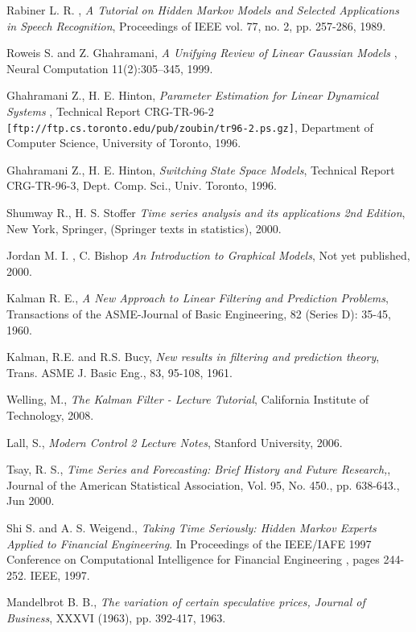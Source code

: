 \documentclass[a4paper,11pt]{article}
\begin{document}
\begin{thebibliography}{99}
  
 Rabiner L. R. , 
  {\em A Tutorial on Hidden Markov Models and Selected Applications in Speech Recognition}, 
  Proceedings of IEEE vol. 77, no. 2, pp. 257-286, 
  1989.

 Roweis S. and Z. Ghahramani,
  {\em  A Unifying Review of Linear Gaussian Models },
   Neural Computation 11(2):305--345, 
   1999.
   
 Ghahramani Z., H. E. Hinton, 
  {\em Parameter Estimation for Linear Dynamical Systems },
   Technical Report CRG-TR-96-2  
   \verb![ftp://ftp.cs.toronto.edu/pub/zoubin/tr96-2.ps.gz]!,
   Department of Computer Science, University of Toronto, 
   1996.

 Ghahramani Z., H. E. Hinton,
  {\em Switching State Space Models},
  Technical Report CRG-TR-96-3, Dept. Comp. Sci., Univ. Toronto, 
  1996.
   
 Shumway R., H. S. Stoffer
  {\em Time series analysis and its applications 2nd Edition},
   New York, Springer, (Springer texts in statistics),
   2000.
   
 Jordan M. I. , C. Bishop
  {\em An Introduction to Graphical Models},
   Not yet published, 
   2000.

 Kalman R. E.,
  {\em A New Approach to Linear Filtering and Prediction Problems},
  Transactions of the ASME-Journal of Basic Engineering, 82 (Series D): 35-45, 
  1960.

 Kalman, R.E. and R.S. Bucy, 
  {\em New results in filtering and prediction theory},
  Trans. ASME J. Basic Eng., 83, 95-108,
  1961.
  
 Welling, M.,
  {\em The Kalman Filter - Lecture Tutorial},
   California Institute of Technology,
   2008.
   
 Lall, S.,
  {\em Modern Control 2 Lecture Notes},
   Stanford University,
   2006.
  
 Tsay, R. S.,
  {\em Time Series and Forecasting: Brief History and Future Research,},
  Journal of the American Statistical Association, Vol. 95, No. 450., pp. 638-643.,
  Jun 2000.

 Shi S. and A. S. Weigend., {\em Taking Time Seriously: Hidden
  Markov Experts Applied to Financial Engineering}. In Proceedings of the
  IEEE/IAFE 1997 Conference on Computational Intelligence for Financial
  Engineering , pages 244-252. IEEE, 
  1997.
    
 Mandelbrot B. B., 
  {\em The variation of certain speculative prices, Journal of Business},
  XXXVI (1963), pp. 392-417, 
  1963.
  
\end{thebibliography}
\end{document}
